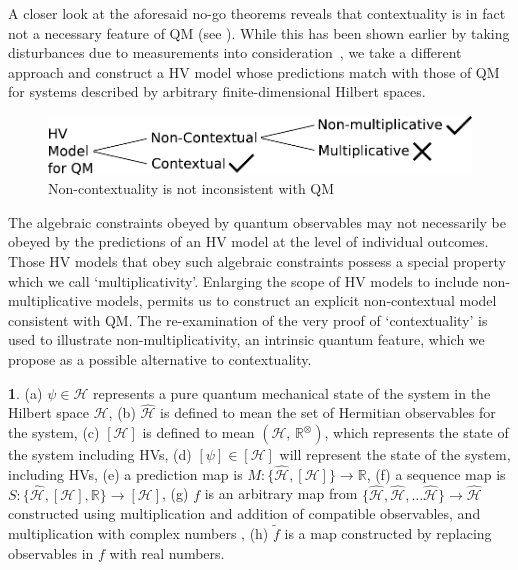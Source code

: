 \documentclass[british,aps,prl,superscriptaddress,nofootinbib,times,reprint]{revtex4-1}
\theoremstyle{plain}
\theoremstyle{plain}
\theoremstyle{definition}
\theoremstyle{remark}
\theoremstyle{remark}
\theoremstyle{remark}
\theoremstyle{plain}
\theoremstyle{plain}
\theoremstyle{plain}
\theoremstyle{definition}
\theoremstyle{definition}
\newtheorem*{notn*}{\protect\notationname}
\providecommand{\notationname}{Notation}
\begin{document}
A closer look at the aforesaid no-go theorems
reveals that contextuality is in fact not a
necessary feature of QM (see ).
While this has been shown earlier by taking
disturbances due to measurements into
consideration~\cite{NoContextuality},
we take a different approach 
and construct a 
HV model whose 
predictions match with those of QM for systems
described by arbitrary finite-dimensional Hilbert
spaces.  \begin{figure}[h]
\includegraphics[width=0.9\columnwidth]{block1}
\caption{Non-contextuality is not inconsistent
with QM} \label{fig:block}\end{figure} The
algebraic constraints obeyed by quantum
observables may not necessarily be obeyed by the
predictions of an HV model at the level of
individual outcomes.  Those HV models that obey
such algebraic constraints possess a special
property which we call `multiplicativity'.  
Enlarging the scope of HV models to include
non-multiplicative models, permits us to construct an
explicit non-contextual model consistent with QM.
The re-examination of the very proof of
`contextuality'  is used to illustrate
non-multiplicativity, an intrinsic quantum feature, 
which we propose as a possible alternative to contextuality. 


\begin{notn*}
(a) $\psi\in\mathcal{H}$ 
represents a pure quantum mechanical
state of the system in the Hilbert space
$\mathcal{H}$, (b) $\hat{\mathcal{H}}$ is defined
to mean the set of Hermitian 
observables for the system, (c)
$[\mathcal{H}]$ is defined to mean
$(\mathcal{H},\,\mathbb{R}^{\otimes})$, which
represents the state of the system including HVs,
(d) $[\psi]\in[\mathcal{H}]$ will represent the
state of the system, including HVs, (e) a
prediction map is
$M:\{ \hat{\mathcal{H}},[\mathcal{H}] \}\to\mathbb{R}$,
(f) a sequence map is
$S:\{ \hat{\mathcal{H}},[\mathcal{H}],\mathbb{R} \}\to[\mathcal{H}]$,
(g) $f$ is an arbitrary map from $\{
\hat{\mathcal{H}},\hat{\mathcal{H}},\dots\hat{\mathcal{H}}
\} \to \hat{\mathcal{H}}$ constructed using
multiplication and addition of compatible observables,
and multiplication with complex
numbers
, (h) $\tilde{f}$ is a map constructed by
replacing observables in $f$ with real numbers.
\end{notn*}
\end{document}
